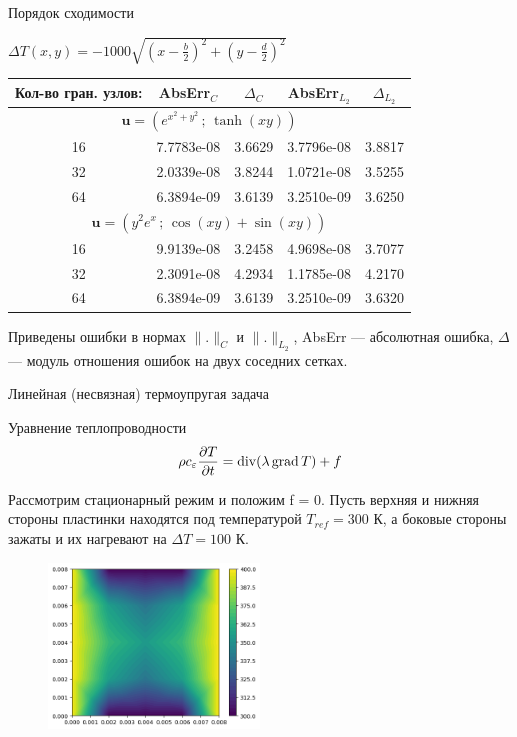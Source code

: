 \documentclass{beamer}
\begin{document}
\begin{frame}{Порядок сходимости}	\small
\begin{block}{$\Delta T(x,y) = -1000\sqrt{\left(x-\frac{b}{2}\right)^2+\left(y-\frac{d}{2}\right)^2}$}
	\begin{tabular}{|c|c|c|c|c|}
		\hline
			Кол-во гран. узлов: & AbsErr$_{C}$ & $\Delta_C$ & AbsErr$_{L_2}$ & $\Delta_{L_2}$ \\ 
		\hline
		\multicolumn{5}{|c|}{$\mathbf{u} = \left(e^{x^2+y^2}\,;\,\tanh(xy)\right)$}\\
		\hline
	 16&7.7783e-08&3.6629&3.7796e-08&3.8817\\
	 	 32&2.0339e-08& 3.8244&1.0721e-08 &3.5255\\
	 	 	 64&6.3894e-09&3.6139&3.2510e-09 &3.6250\\
	 	 	 \hline
	 	 	 \multicolumn{5}{|c|}{$\mathbf{u} = \left(y^2e^x\,;\,\cos(xy)+\sin(xy)\right)$}\\
	 	 	 \hline
	 	 	 16&9.9139e-08&3.2458&4.9698e-08&3.7077\\
	 	 	 32&2.3091e-08&4.2934&1.1785e-08 &4.2170\\
	 	 	 64&6.3894e-09&3.6139&3.2510e-09 &3.6320\\
	 	 	 \hline
	\end{tabular}
\end{block}
Приведены ошибки в нормах $\|.\|_C$ и $\|.\|_{L_2}$, AbsErr --- абсолютная ошибка, $\Delta$ --- модуль отношения ошибок на двух соседних сетках.
\end{frame}

\begin{frame}{Линейная (несвязная) термоупругая задача}
	\begin{block}{Уравнение теплопроводности}
		\[
		\rho c_\varepsilon\frac{\partial T}{\partial t}=\mathrm{div}(\lambda\,\mathrm{grad}\, T)+f
		\]		
	\end{block}
Рассмотрим стационарный режим и положим f = 0. Пусть верхняя и нижняя стороны пластинки находятся под температурой $T_{ref}=300$ К, а боковые стороны зажаты и их нагревают на $\Delta T = 100$ К.
	\begin{figure}[H]
	\centering
	\includegraphics[width=0.5\textwidth]{tempreture1}
\end{figure}
\end{frame}
\end{document}
